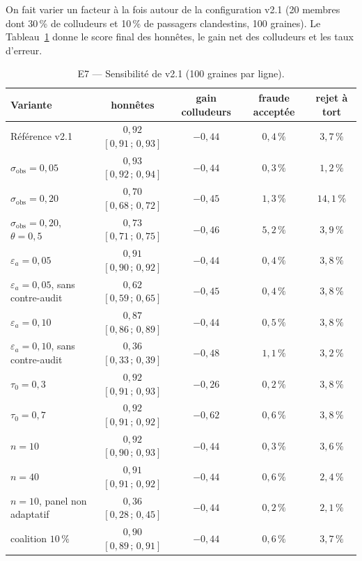 \documentclass[11pt,a4paper]{article}
\theoremstyle{plain}
\theoremstyle{definition}
\theoremstyle{remark}
\newcommand{\1}{\mathbf{1}}
\begin{document}
On fait varier un facteur à la fois autour de la configuration v2.1
(20 membres dont 30\,\% de colludeurs et 10\,\% de passagers clandestins,
100 graines). Le Tableau~\ref{tab:E7} donne le score final des honnêtes, le gain
net des colludeurs et les taux d'erreur.

\begin{table}[h]
\centering
\caption{E7 --- Sensibilité de v2.1 (100 graines par ligne).}
\label{tab:E7}
\small
\begin{tabular}{lcccc}
\toprule
Variante & honnêtes & gain colludeurs & fraude acceptée & rejet à tort \\
\midrule
Référence v2.1 & $0{,}92$ $[0{,}91\,;\,0{,}93]$ & $-0{,}44$ & $0{,}4\,\%$ & $3{,}7\,\%$ \\
$\sigma_{\text{obs}}=0{,}05$ & $0{,}93$ $[0{,}92\,;\,0{,}94]$ & $-0{,}44$ & $0{,}3\,\%$ & $1{,}2\,\%$ \\
$\sigma_{\text{obs}}=0{,}20$ & $0{,}70$ $[0{,}68\,;\,0{,}72]$ & $-0{,}45$ & $1{,}3\,\%$ & $14{,}1\,\%$ \\
$\sigma_{\text{obs}}=0{,}20$, $\theta=0{,}5$ & $0{,}73$ $[0{,}71\,;\,0{,}75]$ & $-0{,}46$ & $5{,}2\,\%$ & $3{,}9\,\%$ \\
$\varepsilon_a=0{,}05$ & $0{,}91$ $[0{,}90\,;\,0{,}92]$ & $-0{,}44$ & $0{,}4\,\%$ & $3{,}8\,\%$ \\
$\varepsilon_a=0{,}05$, sans contre-audit & $0{,}62$ $[0{,}59\,;\,0{,}65]$ & $-0{,}45$ & $0{,}4\,\%$ & $3{,}8\,\%$ \\
$\varepsilon_a=0{,}10$ & $0{,}87$ $[0{,}86\,;\,0{,}89]$ & $-0{,}44$ & $0{,}5\,\%$ & $3{,}8\,\%$ \\
$\varepsilon_a=0{,}10$, sans contre-audit & $0{,}36$ $[0{,}33\,;\,0{,}39]$ & $-0{,}48$ & $1{,}1\,\%$ & $3{,}2\,\%$ \\
$\tau_0=0{,}3$ & $0{,}92$ $[0{,}91\,;\,0{,}93]$ & $-0{,}26$ & $0{,}2\,\%$ & $3{,}8\,\%$ \\
$\tau_0=0{,}7$ & $0{,}92$ $[0{,}91\,;\,0{,}92]$ & $-0{,}62$ & $0{,}6\,\%$ & $3{,}8\,\%$ \\
$n=10$ & $0{,}92$ $[0{,}90\,;\,0{,}93]$ & $-0{,}44$ & $0{,}3\,\%$ & $3{,}6\,\%$ \\
$n=40$ & $0{,}91$ $[0{,}91\,;\,0{,}92]$ & $-0{,}44$ & $0{,}6\,\%$ & $2{,}4\,\%$ \\
$n=10$, panel non adaptatif & $0{,}36$ $[0{,}28\,;\,0{,}45]$ & $-0{,}44$ & $0{,}2\,\%$ & $2{,}1\,\%$ \\
coalition $10\,\%$ & $0{,}90$ $[0{,}89\,;\,0{,}91]$ & $-0{,}44$ & $0{,}6\,\%$ & $3{,}7\,\%$ \\

\end{tabular}
\end{table}
\end{document}
